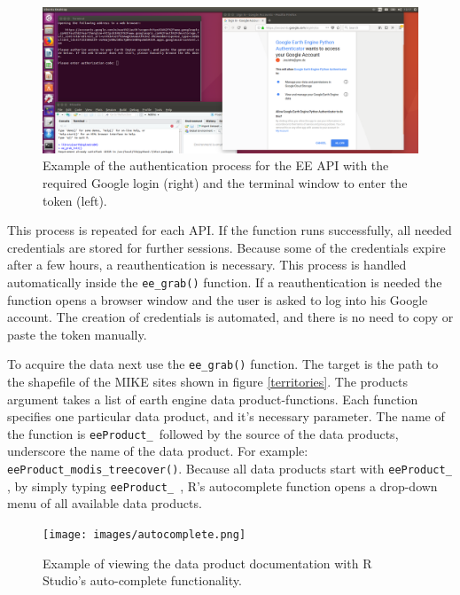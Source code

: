 \begin{center}
	\begin{figure}[h]
		\begin{center}
			\includegraphics[width=15cm]{images/install_authentication.png}
			\caption{Example of the authentication process for the EE API with the required Google login (right) and the terminal window to enter the token (left).}
			\label{install}
		\end{center}
	\end{figure}
\end{center}



This process is repeated for each API. If the function runs successfully, all needed credentials are stored for further sessions. Because some of the credentials expire after a few hours, a reauthentication is necessary. This process is handled automatically inside the \texttt{ee\_grab()} function. If a reauthentication is needed the function opens a browser window and the user is asked to log into his Google account. The creation of credentials is automated, and there is no need to copy or paste the token manually.

To acquire the data next use the \texttt{ee\_grab()} function. The target is the path to the shapefile of the MIKE sites shown in figure \ref{territories}. The products argument takes a list of earth engine data product-functions. Each function specifies one particular data product, and it's necessary parameter. The name of the function is \texttt{eeProduct\_ }followed by the source of the data products, underscore the name of the data product. For example: \texttt{eeProduct\_modis\_treecover()}. Because all data products start with \texttt{eeProduct\_ }, by simply typing \texttt{eeProduct\_ }, R's autocomplete function opens a drop-down menu of all available data products. 

\begin{center}
	\begin{figure}[h]
		\begin{center}
			\texttt{[image: images/autocomplete.png]}
			\caption{Example of viewing the data product documentation with R Studio's auto-complete functionality.}
			\label{install}
		\end{center}
	\end{figure}
\end{center}



